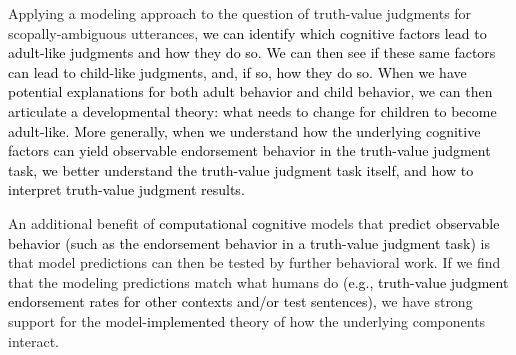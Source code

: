 \documentclass[cm]{glossa}
\newcommand{\lp}[1]{\textcolor{black}{#1}} %
\begin{document}
Applying a modeling approach to the question of truth-value judgments for scopally-ambiguous utterances, \lp{ we can identify which cognitive factors lead to adult-like judgments and how they do so. We can then see if these same factors can lead to child-like judgments, and, if so, how they do so. When we have potential explanations for both adult behavior and child behavior, we can then articulate a developmental theory: what needs to change for children to become adult-like.}
 \lp{More generally, when we understand how the underlying cognitive factors can yield observable endorsement behavior in the truth-value judgment task, we better understand the truth-value judgment task itself, and how to interpret truth-value judgment results.}

 An additional benefit of \lp{computational cognitive} models that 
 \lp{predict observable behavior (such as the endorsement behavior in a truth-value judgment task)}
 is that model predictions can then be tested by further behavioral work. If we find that the modeling predictions match what humans do
 \lp{(e.g., truth-value judgment endorsement rates for other contexts and/or test sentences)}, we have strong support for the model-\lp{implemented} theory of how the underlying components interact. 
\end{document}

